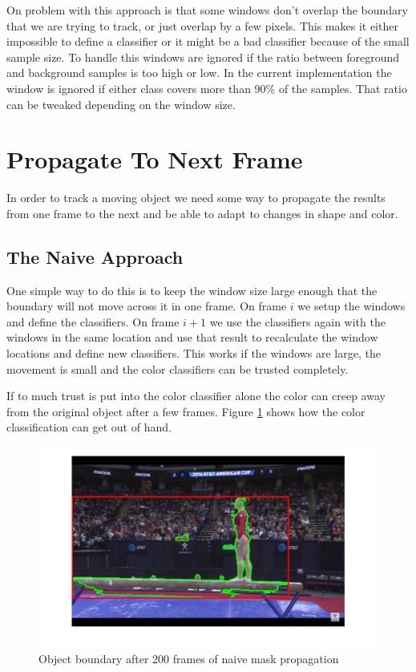 \documentclass[12pt]{article}
\begin{document}
On problem with this approach is that some windows don't overlap the boundary that we are trying to track, or just overlap by a few pixels. This makes it either impossible to define a classifier or it might be a bad classifier because of the small sample size. To handle this windows are ignored if the ratio between foreground and background samples is too high or low. In the current implementation the window is ignored if either class covers more than 90\% of the samples. That ratio can be tweaked depending on the window size.


\section{Propagate To Next Frame}

In order to track a moving object we need some way to propagate the results from one frame to the next and be able to adapt to changes in shape and color.

\subsection{The Naive Approach}

One simple way to do this is to keep the window size large enough that the boundary will not move across it in one frame. On frame $i$ we setup the windows and define the classifiers. On frame $i+1$ we use the classifiers again with the windows in the same location and use that result to recalculate the window locations and define new classifiers. This works if the windows are large, the movement is small and the color classifiers can be trusted completely.

If to much trust is put into the color classifier alone the color can creep away from the original object after a few frames. Figure \ref{fig_color_creep} shows how the color classification can get out of hand.

\begin{figure}
	\centering
    \includegraphics[width=0.6\linewidth]{img/color_creep}
    \caption{Object boundary after 200 frames of naive mask propagation}
    \label{fig_color_creep}
\end{figure}
\end{document}
